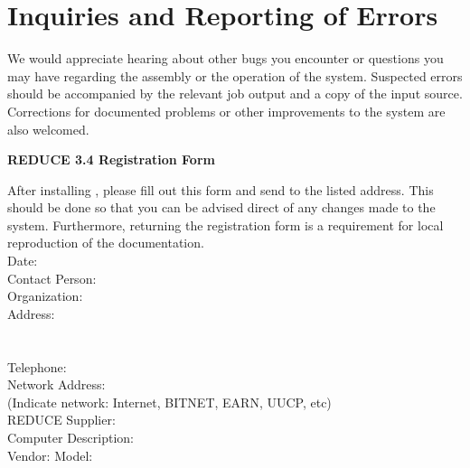 \section{Inquiries and Reporting of Errors}
We would appreciate hearing about other bugs you encounter or
questions you may have regarding the assembly or the operation of the system.
Suspected errors should be accompanied by the relevant job output and a copy
of the input source.  Corrections for documented problems or other
improvements to the system are also welcomed.

\newpage
\pagestyle{empty}
\begin{center}
{\Large\bf  REDUCE 3.4  Registration Form}
\end{center}
After installing {\REDUCE}, please fill out this form and send to the
listed address.  This should be done so that you can be
advised direct of any changes made to the system.  Furthermore, returning
the registration form is a requirement for local reproduction of the
{\REDUCE} documentation.
\vspace*{3mm} \\
Date: \hrulefill \vspace*{3mm}\\
Contact Person: \hrulefill\ \vspace*{3mm}\\
Organization: \hrulefill \vspace*{3mm} \\
Address: \hrulefill \vspace*{3mm} \\
\hspace*{16 mm} \hrulefill \vspace*{3mm} \\
\hspace*{16 mm} \hrulefill \vspace*{3mm} \\
Telephone: \hrulefill\ \vspace*{3mm} \\
Network Address: \hrulefill \\
{\small (Indicate network: Internet, BITNET, EARN, UUCP, etc)}
\vspace*{3 mm} \\
REDUCE Supplier: \hrulefill \\[3mm]
Computer Description:
\vspace*{3 mm} \\
Vendor: \hrulefill \vspace*{2mm}    Model: \hrulefill \vspace*{2mm}
